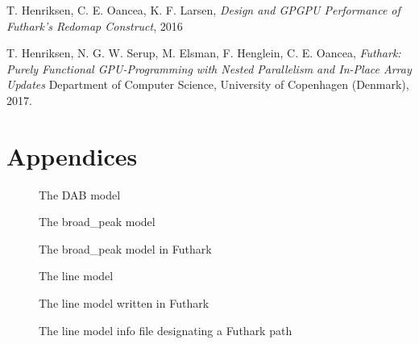 \documentclass[11pt]{article}
\begin{document}
\begin{thebibliography}{1}

  T. Henriksen,
  C. E. Oancea,
  K. F. Larsen,
  \textit{Design and GPGPU Performance of Futhark's Redomap Construct},
  2016

  T. Henriksen,
  N. G. W. Serup,
  M. Elsman,
  F. Henglein,
  C. E. Oancea,
  \textit{Futhark: Purely Functional GPU-Programming with Nested Parallelism 
  and In-Place Array Updates}
  Department of Computer Science,
  University of Copenhagen (Denmark),
  2017.

\end{thebibliography}

\newpage
\section*{Appendices}
\begin{figure}
  
  \caption{The DAB model}
  \label{fig:dabmodel}
\end{figure}

\begin{figure}
  
  \caption{The broad\_peak model}
  \label{fig:broadpeakmodel}
\end{figure}

\begin{figure}
  
  \caption{The broad\_peak model in Futhark}
  \label{fig:broadpeakmodel_futhark}
\end{figure}

\begin{figure}
  
  \caption{The line model}
  \label{fig:linemodel}
\end{figure}

\begin{figure}
  
  \caption{The line model written in Futhark}
  \label{fig:linemodel-futhark}
\end{figure}

\begin{figure}
  
  \caption{The line model info file designating a Futhark path}
  \label{fig:linemodelinfo-futhark}
\end{figure}
\end{document}
